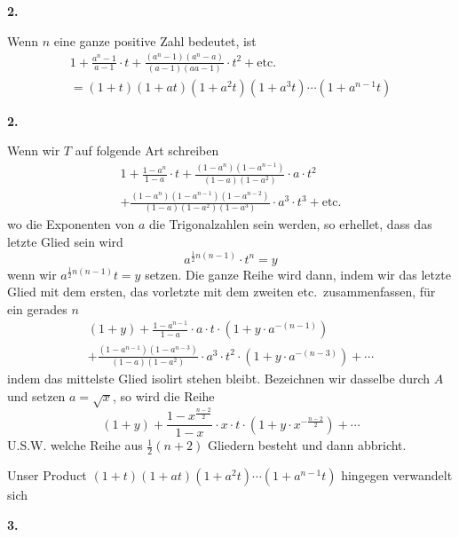 \documentclass[10pt,a4paper]{article}
\begin{document}
\newpage
\textbf{2.}

Wenn $n$ eine ganze positive Zahl bedeutet, ist
%
\begin{multline*}
1 + \frac{a^n - 1}{a - 1} \cdot t + \frac{(a^n - 1)(a^n - a)}{(a - 1)(aa - 1)} \cdot t^2 + \text{etc.} \\
= (1 + t)(1 + at)(1 + a^2t)(1 + a^3t) \cdots (1 + a^{n-1}t)
\end{multline*}

\textbf{2.}

Wenn wir $T$ auf folgende Art schreiben
%
\begin{multline*}
1 + \frac{1 - a^n}{1 - a} \cdot t + \frac{(1 - a^n)(1 - a^{n-1})}{(1 - a)(1 - a^2)} \cdot a \cdot t^2 \\
+ \frac{(1 - a^n)(1 - a^{n-1})(1 - a^{n-2})}{(1 - a)(1 - a^2)(1 - a^3)} \cdot a^3 \cdot t^3 + \text{etc.}
\end{multline*}
%
wo die Exponenten von $a$ die Trigonalzahlen sein werden, so erhellet, dass das letzte Glied sein wird
%
\begin{equation*}
a^{\frac{1}{2}n(n-1)} \cdot t^n = y
\end{equation*}
%
wenn wir $a^{\frac{1}{2}n(n-1)} t = y$ setzen. Die ganze Reihe wird dann, indem wir das letzte Glied mit dem ersten, das vorletzte mit dem zweiten etc.\ zusammenfassen, f\"ur ein gerades $n$
%
\begin{multline*}
(1 + y) + \frac{1 - a^{n-1}}{1 - a} \cdot a \cdot t \cdot (1 + y \cdot a^{-(n-1)}) \\
+ \frac{(1 - a^{n-1})(1 - a^{n-3})}{(1 - a)(1 - a^2)} \cdot a^3 \cdot t^2 \cdot (1 + y \cdot a^{-(n-3)}) + \cdots
\end{multline*}
%
indem das mittelste Glied isolirt stehen bleibt. Bezeichnen wir dasselbe durch $A$ und setzen $a = \sqrt{x}$, so wird die Reihe
%
\begin{equation*}
(1 + y) + \frac{1 - x^{\frac{n-2}{2}}}{1 - x} \cdot x \cdot t \cdot (1 + y \cdot x^{-\frac{n-2}{2}}) + \cdots
\end{equation*}
%
U.S.W. welche Reihe aus $\frac{1}{2}(n + 2)$ Gliedern besteht und dann abbricht.

Unser Product $(1 + t)(1 + at)(1 + a^2t) \cdots (1 + a^{n-1}t)$ hingegen verwandelt sich

\newpage
\textbf{3.}
\end{document}
